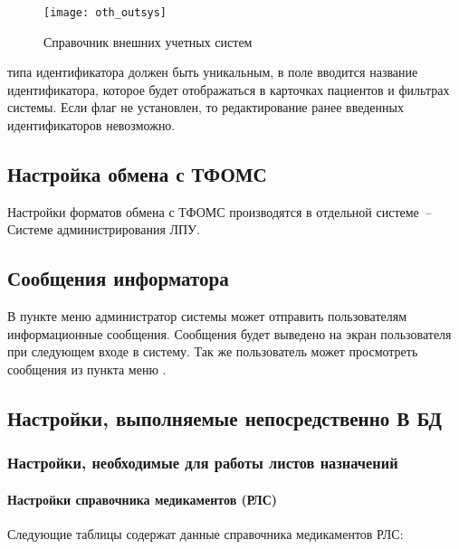 \begin{figure}[ht]\centering
 \texttt{[image: oth\_outsys]}
 \caption{Справочник внешних учетных систем}
 \label{img_oth_outsys}
\end{figure}

 типа идентификатора должен быть уникальным, в поле  вводится название идентификатора, которое будет отображаться в карточках пациентов и фильтрах системы. Если флаг  не установлен, то редактирование ранее введенных идентификаторов невозможно.

\subsection{Настройка обмена с ТФОМС}

Настройки форматов обмена с ТФОМС производятся в отдельной системе~– Системе администрирования ЛПУ.

\subsection{Сообщения информатора}

В пункте меню  администратор системы может отправить  пользователям информационные сообщения. Сообщения будет выведено на экран пользователя при следующем входе в систему. Так же пользователь может просмотреть сообщения из пункта меню .

\subsection{Настройки, выполняемые непосредственно В БД}

\subsubsection{Настройки, необходимые для работы листов назначений} 
\paragraph{Настройки справочника медикаментов (РЛС)}

Следующие таблицы содержат данные справочника медикаментов РЛС:

